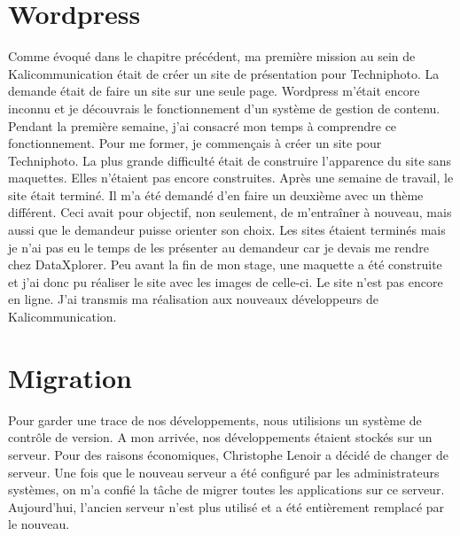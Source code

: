 
\section{Wordpress}
Comme évoqué dans le chapitre précédent, ma première mission au sein de Kalicommunication était de créer un site de présentation pour Techniphoto. La demande était de faire un site sur une seule page. Wordpress m'était encore inconnu et je découvrais le fonctionnement d'un système de gestion de contenu. Pendant la première semaine, j'ai consacré mon temps à comprendre ce fonctionnement. Pour me former, je commençais à créer un site pour Techniphoto. La plus grande difficulté  était de construire l'apparence du site sans maquettes. Elles n'étaient pas encore construites.\newline
Après une semaine de travail, le site était terminé. Il m'a été demandé d'en faire un deuxième avec un thème différent. Ceci avait pour objectif, non seulement, de m'entraîner à nouveau, mais aussi que le demandeur puisse orienter son choix.\newline
Les sites étaient terminés mais je n'ai pas eu le temps de les présenter au demandeur car je devais me rendre chez DataXplorer.
Peu avant la fin de mon stage, une maquette a été construite et j'ai donc pu réaliser le site avec les images de celle-ci. Le site n'est pas encore en ligne. J'ai transmis ma réalisation aux nouveaux développeurs de Kalicommunication.

\section{Migration}
Pour garder une trace de nos développements, nous utilisions un système de contrôle de version. A mon arrivée, nos développements étaient stockés sur un serveur. Pour des raisons économiques, Christophe Lenoir a décidé de changer de serveur. Une fois que le nouveau serveur a été configuré par les administrateurs systèmes, on m'a confié la tâche de migrer toutes les applications sur ce serveur. Aujourd'hui, l'ancien serveur n'est plus utilisé et a été entièrement remplacé par le nouveau.


